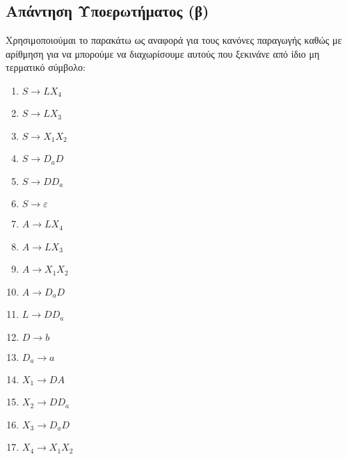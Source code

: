 \subsection{Απάντηση Υποερωτήματος (β)}
\label{ssec:Solution_4.2}
\doublespacing

Χρησιμοποιούμαι το παρακάτω ως αναφορά για τους κανόνες παραγωγής καθώς με αρίθμηση για να μπορούμε να διαχωρίσουμε
αυτούς που ξεκινάνε από ίδιο μη τερματικό σύμβολο:

\begin{multicols}{2}
	\begin{enumerate}
		\item $S\rightarrow LX_4$
	    \item $S\rightarrow LX_3$
		\item $S\rightarrow X_1X_2$
		\item $S\rightarrow D_aD$
		\item $S\rightarrow DD_a$
		\item $S\rightarrow \varepsilon$

		\item $A\rightarrow LX_4$
		\item $A\rightarrow LX_3$
		\item $A\rightarrow X_1X_2$
		\item $A\rightarrow D_aD$

		\item $L\rightarrow DD_a$

		\item $D\rightarrow b$

		\item $D_a\rightarrow a$

		\item $X_1\rightarrow DA$

		\item $X_2\rightarrow DD_a$

		\item $X_3\rightarrow D_aD$

		\item $X_4\rightarrow X_1X_2$
	\end{enumerate}
\end{multicols}
\vfill
\clearpage



